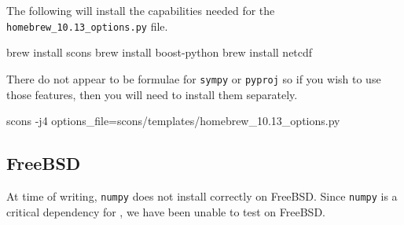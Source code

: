 The following will install the capabilities needed for the \texttt{homebrew_10.13_options.py} file.

\begin{shellCode}
brew install scons
brew install boost-python
brew install netcdf
\end{shellCode}

There do not appear to be formulae for \texttt{sympy} or \texttt{pyproj} so if you wish to use those features, then
you will need to install them separately.


\begin{shellCode}
scons -j4 options_file=scons/templates/homebrew_10.13_options.py
\end{shellCode}


\subsection{FreeBSD}\label{sec:freebsdsrc}

At time of writing, \texttt{numpy} does not install correctly on FreeBSD.
Since \texttt{numpy} is a critical dependency for \escript, we have been unable to test on FreeBSD.

